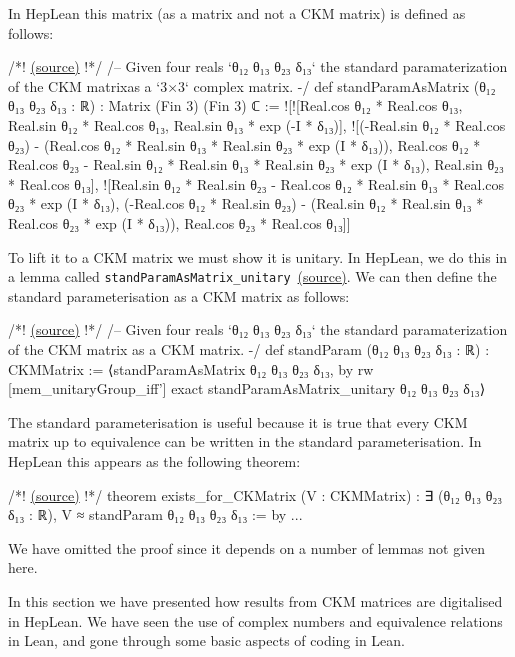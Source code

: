 \documentclass[a4paper, 11pt]{article}
\newcommand{\codeLink}[1]{
  \vspace{-0.5cm}\hfill\href{https://github.com/HEPLean/HepLean/blob/1b951994ae3d882242b02d23957ef1ee7fa05f3d/HepLean/#1}{(source)}
  }
\newcommand{\textLinkB}[1]{\href{https://github.com/HEPLean/HepLean/blob/1b951994ae3d882242b02d23957ef1ee7fa05f3d/HepLean/#1}{(source)}}
\begin{document}
In HepLean this matrix (as a matrix and not a CKM matrix) is defined as follows:
\begin{code}
/*!\codeLink{FlavorPhysics/CKMMatrix/StandardParameterization/Basic.lean\#L28}!*/
/-- Given four reals `θ₁₂ θ₁₃ θ₂₃ δ₁₃` the standard 
paramaterization of the CKM matrixas a `3×3` complex matrix. -/
def standParamAsMatrix (θ₁₂ θ₁₃ θ₂₃ δ₁₃ : ℝ) : Matrix (Fin 3) (Fin 3) ℂ  :=
  ![![Real.cos θ₁₂ * Real.cos θ₁₃, Real.sin θ₁₂ * Real.cos θ₁₃, 
   Real.sin θ₁₃ * exp (-I * δ₁₃)],
    ![(-Real.sin θ₁₂ * Real.cos θ₂₃) - (Real.cos θ₁₂ * Real.sin θ₁₃ * Real.sin θ₂₃ 
      * exp (I * δ₁₃)), Real.cos θ₁₂ * Real.cos θ₂₃ - Real.sin θ₁₂ * Real.sin θ₁₃ * 
      Real.sin θ₂₃ * exp (I * δ₁₃), Real.sin θ₂₃ * Real.cos θ₁₃],
    ![Real.sin θ₁₂ * Real.sin θ₂₃ - Real.cos θ₁₂ * Real.sin θ₁₃ * Real.cos θ₂₃ 
      * exp (I * δ₁₃), (-Real.cos θ₁₂ * Real.sin θ₂₃) - (Real.sin θ₁₂ * Real.sin θ₁₃ 
      * Real.cos θ₂₃ * exp (I * δ₁₃)), Real.cos θ₂₃ * Real.cos θ₁₃]]
\end{code}
To lift it to a CKM matrix we must show it is unitary. In HepLean, we do this in a lemma called \lstinline|standParamAsMatrix_unitary|~\textLinkB{FlavorPhysics/CKMMatrix/StandardParameterization/Basic.lean\#L41}.
We can then define the standard parameterisation as a CKM matrix as follows:
\begin{code}
/*!\codeLink{FlavorPhysics/CKMMatrix/StandardParameterization/Basic.lean\#L101}!*/
/-- Given four reals `θ₁₂ θ₁₃ θ₂₃ δ₁₃` the standard paramaterization 
of the CKM matrix as a CKM matrix. -/
def standParam (θ₁₂ θ₁₃ θ₂₃ δ₁₃ : ℝ) : CKMMatrix :=
  ⟨standParamAsMatrix θ₁₂ θ₁₃ θ₂₃ δ₁₃, by
   rw [mem_unitaryGroup_iff']
   exact standParamAsMatrix_unitary θ₁₂ θ₁₃ θ₂₃ δ₁₃⟩
\end{code}


The standard parameterisation is useful because it is true that every CKM matrix up to equivalence can be written in the standard parameterisation. In HepLean this appears as the following theorem:
\begin{code}
/*!\codeLink{FlavorPhysics/CKMMatrix/StandardParameterization/StandardParameters.lean\#L674}!*/
theorem exists_for_CKMatrix (V : CKMMatrix) :
    ∃ (θ₁₂ θ₁₃ θ₂₃ δ₁₃ : ℝ), V ≈ standParam θ₁₂ θ₁₃ θ₂₃ δ₁₃ := by
  ...
\end{code}
We have omitted the proof since it depends on a number of lemmas not given here.

In this section we have presented how results from CKM matrices are digitalised in HepLean. We have seen the use of complex numbers and equivalence relations in Lean, and gone through some basic aspects of coding in Lean. 
\end{document}
